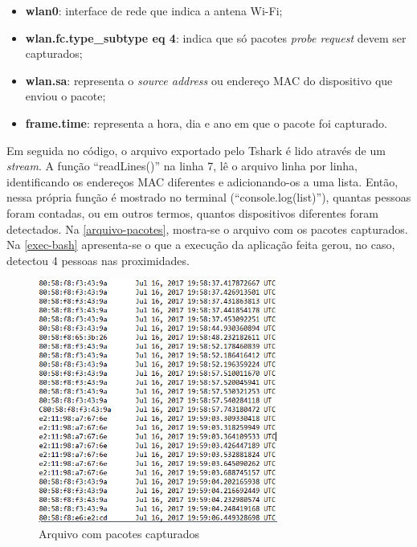 \begin{itemize}
  \item \textbf{wlan0}: interface de rede que indica a antena Wi-Fi;
  \item \textbf{wlan.fc.type\_subtype eq 4}: indica que só pacotes \emph{probe request} devem ser capturados;
  \item \textbf{wlan.sa}: representa o \emph{source address} ou endereço MAC do dispositivo que enviou o pacote;
  \item \textbf{frame.time}: representa a hora, dia e ano em que o pacote foi capturado.
\end{itemize}

Em seguida no código, o arquivo exportado pelo Tshark é lido através de um \emph{stream}. A função ``readLines()''
na linha 7, lê o arquivo linha por linha, identificando os endereços MAC diferentes e adicionando-os a uma lista.
Então, nessa própria função é mostrado no terminal (``console.log(list)''), quantas pessoas foram contadas, ou em outros termos,
quantos dispositivos diferentes foram detectados. Na \autoref{arquivo-pacotes}, mostra-se o arquivo com os pacotes
capturados. Na \autoref{exec-bash} apresenta-se o que a execução da aplicação feita gerou, no caso, detectou
4 pessoas nas proximidades.

\begin{figure}[!h]
  \caption{\label{arquivo-pacotes}Arquivo com pacotes capturados}
  \begin{center}
    \includegraphics[width=0.70\textwidth]{img/packets.png}
  \end{center}
\end{figure}

